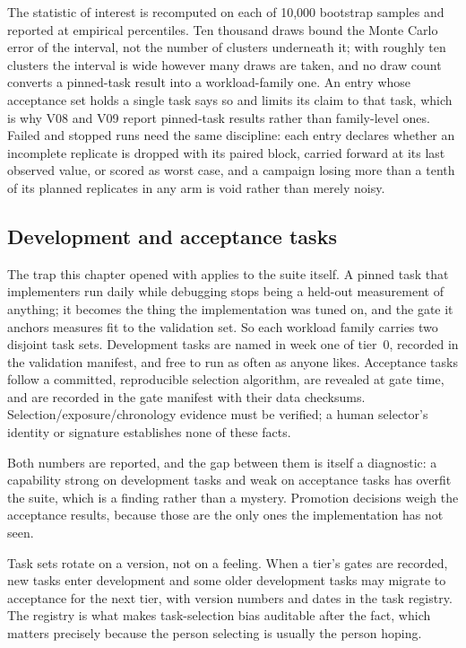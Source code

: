 The statistic of interest is recomputed on each of 10,000 bootstrap
samples and reported at empirical percentiles. Ten thousand draws bound
the Monte Carlo error of the interval, not the number of clusters
underneath it; with roughly ten clusters the interval is wide however
many draws are taken, and no draw count converts a pinned-task result
into a workload-family one. An entry whose acceptance set holds a single
task says so and limits its claim to that task, which is why V08 and
V09 report pinned-task results rather than family-level ones. Failed and
stopped runs need the same discipline: each entry declares whether an
incomplete replicate is dropped with its paired block, carried forward
at its last observed value, or scored as worst case, and a campaign
losing more than a tenth of its planned replicates in any arm is void
rather than merely noisy.

\subsection{Development and acceptance tasks}

The trap this chapter opened with applies to the suite itself. A
pinned task that implementers run daily while debugging stops being a
held-out measurement of anything; it becomes the thing the
implementation was tuned on, and the gate it anchors measures fit to
the validation set. So each workload family carries two disjoint task
sets. Development tasks are named in week one of tier~0, recorded in
the validation manifest, and free to run as often as anyone likes.
Acceptance tasks follow a committed, reproducible selection algorithm,
are revealed at gate time, and are recorded in the gate manifest with
their data checksums. Selection/exposure/chronology evidence must be
verified; a human selector's identity or signature establishes none of
these facts.

Both numbers are reported, and the gap between them is itself a
diagnostic: a capability strong on development tasks and weak on
acceptance tasks has overfit the suite, which is a finding rather
than a mystery. Promotion decisions weigh the acceptance results,
because those are the only ones the implementation has not seen.

Task sets rotate on a version, not on a feeling. When a tier's gates
are recorded, new tasks enter development and some older development
tasks may migrate to acceptance for the next tier, with version
numbers and dates in the task registry. The registry is what makes
task-selection bias auditable after the fact, which matters
precisely because the person selecting is usually the person hoping.

